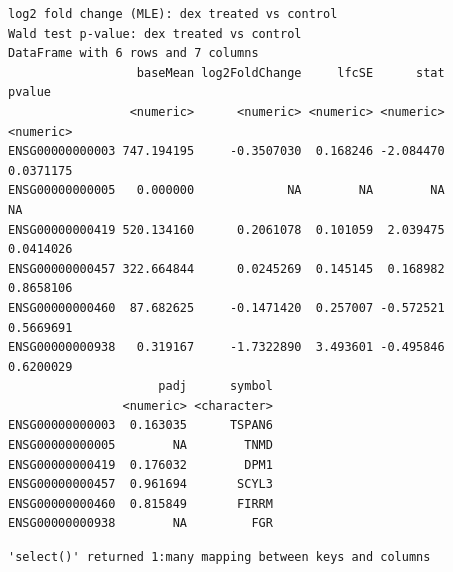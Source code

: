 \documentclass[
  letterpaper,
  DIV=11,
  numbers=noendperiod]{scrartcl}
\newenvironment{Shaded}{\begin{snugshade}}{\end{snugshade}}
\newcommand{\AttributeTok}[1]{\textcolor[rgb]{0.40,0.45,0.13}{#1}}
\newcommand{\FunctionTok}[1]{\textcolor[rgb]{0.28,0.35,0.67}{#1}}
\newcommand{\NormalTok}[1]{\textcolor[rgb]{0.00,0.23,0.31}{#1}}
\newcommand{\OtherTok}[1]{\textcolor[rgb]{0.00,0.23,0.31}{#1}}
\newcommand{\SpecialCharTok}[1]{\textcolor[rgb]{0.37,0.37,0.37}{#1}}
\newcommand{\StringTok}[1]{\textcolor[rgb]{0.13,0.47,0.30}{#1}}
\begin{document}
\begin{verbatim}
log2 fold change (MLE): dex treated vs control 
Wald test p-value: dex treated vs control 
DataFrame with 6 rows and 7 columns
                  baseMean log2FoldChange     lfcSE      stat    pvalue
                 <numeric>      <numeric> <numeric> <numeric> <numeric>
ENSG00000000003 747.194195     -0.3507030  0.168246 -2.084470 0.0371175
ENSG00000000005   0.000000             NA        NA        NA        NA
ENSG00000000419 520.134160      0.2061078  0.101059  2.039475 0.0414026
ENSG00000000457 322.664844      0.0245269  0.145145  0.168982 0.8658106
ENSG00000000460  87.682625     -0.1471420  0.257007 -0.572521 0.5669691
ENSG00000000938   0.319167     -1.7322890  3.493601 -0.495846 0.6200029
                     padj      symbol
                <numeric> <character>
ENSG00000000003  0.163035      TSPAN6
ENSG00000000005        NA        TNMD
ENSG00000000419  0.176032        DPM1
ENSG00000000457  0.961694       SCYL3
ENSG00000000460  0.815849       FIRRM
ENSG00000000938        NA         FGR
\end{verbatim}

\begin{Shaded}
\end{Shaded}

\begin{verbatim}
'select()' returned 1:many mapping between keys and columns
\end{verbatim}

\begin{Shaded}
\end{Shaded}
\end{document}
